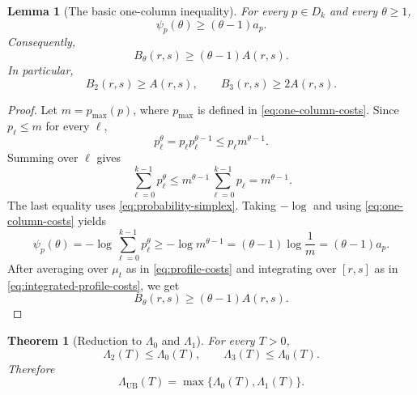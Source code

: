 \documentclass[11pt]{article}
\numberwithin{equation}{section}
\newtheorem{theorem}{Theorem}[section]
\newtheorem{lemma}[lemma]{Lemma}
\newcommand{\1}{\mathbf 1}
\newcommand{\UB}{\mathrm{UB}}
\begin{document}
\begin{lemma}[The basic one-column inequality]
\label{lem:basic-one-column-inequality}
For every $p\in D_k$ and every $\theta\ge1$,
\begin{equation}
\label{eq:one-column-dominance}
  \psi_p(\theta)\ge(\theta-1)a_p.
\end{equation}
Consequently,
\begin{equation}
\label{eq:integrated-one-column-dominance}
  B_\theta(r,s)\ge(\theta-1)A(r,s).
\end{equation}
In particular,
\begin{equation}
\label{eq:basic-b-two-three-dominance}
  B_2(r,s)\ge A(r,s),
  \qquad
  B_3(r,s)\ge2A(r,s).
\end{equation}
\end{lemma}

\begin{proof}
Let $m=p_{\max}(p)$, where $p_{\max}$ is defined in
\eqref{eq:one-column-costs}. Since $p_\ell\le m$ for every $\ell$,
\[
  p_\ell^\theta=p_\ell p_\ell^{\theta-1}\le p_\ell m^{\theta-1}.
\]
Summing over $\ell$ gives
\[
  \sum_{\ell=0}^{k-1}p_\ell^\theta
  \le m^{\theta-1}\sum_{\ell=0}^{k-1}p_\ell
  =m^{\theta-1}.
\]
The last equality uses \eqref{eq:probability-simplex}. Taking $-\log$ and
using \eqref{eq:one-column-costs} yields
\[
  \psi_p(\theta)=-\log\sum_{\ell=0}^{k-1}p_\ell^\theta
  \ge-\log m^{\theta-1}
  =(\theta-1)\log\frac1m
  =(\theta-1)a_p.
\]
After averaging over $\mu_t$ as in \eqref{eq:profile-costs} and integrating
over $[r,s]$ as in \eqref{eq:integrated-profile-costs}, we get
\[
  B_\theta(r,s)\ge(\theta-1)A(r,s).
\]
\end{proof}

\begin{theorem}[Reduction to $\Lambda_0$ and $\Lambda_1$]
\label{thm:dominance-reduction}
For every $T>0$,
\begin{equation}
\label{eq:auxiliary-margin-dominance}
  \Lambda_2(T)\le\Lambda_0(T),
  \qquad
  \Lambda_3(T)\le\Lambda_0(T).
\end{equation}
Therefore
\begin{equation}
\label{eq:two-margin-reduction}
  \Lambda_{\UB}(T)=\max\{\Lambda_0(T),\Lambda_1(T)\}.
\end{equation}
\end{theorem}
\end{document}
